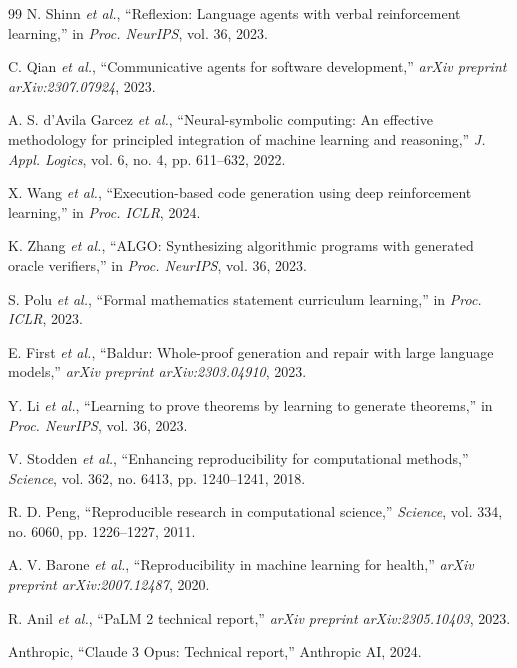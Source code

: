 \documentclass{ieeeaccess}
\begin{document}
\begin{thebibliography}{99}
N. Shinn \emph{et al.}, ``Reflexion: Language agents with verbal reinforcement learning,'' in \emph{Proc. NeurIPS}, vol. 36, 2023.

C. Qian \emph{et al.}, ``Communicative agents for software development,'' \emph{arXiv preprint arXiv:2307.07924}, 2023.

A. S. d'Avila Garcez \emph{et al.}, ``Neural-symbolic computing: An effective methodology for principled integration of machine learning and reasoning,'' \emph{J. Appl. Logics}, vol. 6, no. 4, pp. 611--632, 2022.

X. Wang \emph{et al.}, ``Execution-based code generation using deep reinforcement learning,'' in \emph{Proc. ICLR}, 2024.

K. Zhang \emph{et al.}, ``ALGO: Synthesizing algorithmic programs with generated oracle verifiers,'' in \emph{Proc. NeurIPS}, vol. 36, 2023.

S. Polu \emph{et al.}, ``Formal mathematics statement curriculum learning,'' in \emph{Proc. ICLR}, 2023.

E. First \emph{et al.}, ``Baldur: Whole-proof generation and repair with large language models,'' \emph{arXiv preprint arXiv:2303.04910}, 2023.

Y. Li \emph{et al.}, ``Learning to prove theorems by learning to generate theorems,'' in \emph{Proc. NeurIPS}, vol. 36, 2023.

V. Stodden \emph{et al.}, ``Enhancing reproducibility for computational methods,'' \emph{Science}, vol. 362, no. 6413, pp. 1240--1241, 2018.

R. D. Peng, ``Reproducible research in computational science,'' \emph{Science}, vol. 334, no. 6060, pp. 1226--1227, 2011.

A. V. Barone \emph{et al.}, ``Reproducibility in machine learning for health,'' \emph{arXiv preprint arXiv:2007.12487}, 2020.

R. Anil \emph{et al.}, ``PaLM 2 technical report,'' \emph{arXiv preprint arXiv:2305.10403}, 2023.

Anthropic, ``Claude 3 Opus: Technical report,'' Anthropic AI, 2024.


\end{thebibliography}
\end{document}
